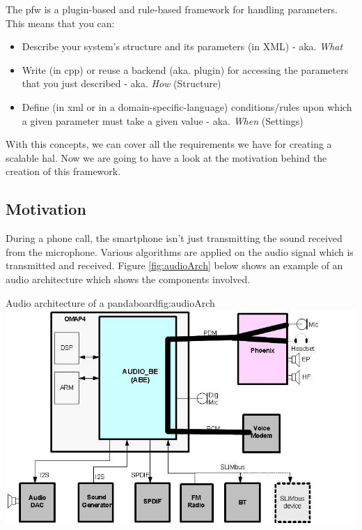 The \gls{pfw} is a plugin-based and rule-based framework for handling parameters. This means that you can:

\begin{itemize}
    \item Describe your system's structure and its parameters (in XML) - aka. \emph{What}
    \item Write (in \gls{cpp}) or reuse a backend (aka. plugin) for accessing the parameters that you just described - aka. \emph{How} (Structure)
    \item Define (in \gls{xml} or in a domain-specific-language) conditions/rules upon which a given parameter must take a given value - aka. \emph{When} (Settings)
\end{itemize}

With this concepts, we can cover all the requirements we have for creating a scalable \gls{hal}.
Now we are going to have a look at the motivation behind the creation of this framework.

\subsection{Motivation}
During a phone call, the smartphone isn't just transmitting the sound received from the microphone. Various algorithms are
applied on the audio signal which is transmitted and received.
Figure \ref{fig:audioArch} below shows an example of an audio architecture which shows the components involved.

\begin{figureGraphics}{Audio architecture of a pandaboard}{fig:audioArch}
    \includegraphics[height=0.5\textheight]{./src/img/Audio_arch2.jpg}
\end{figureGraphics}

